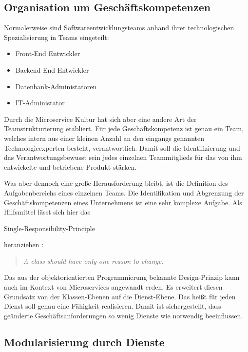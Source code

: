 \subsection{Organisation um Geschäftskompetenzen}

Normalerweise sind Softwareentwicklungsteams anhand ihrer technologischen Spezialisierung in Teams eingeteilt:

\begin{itemize}
	\item Front-End Entwickler
	\item Backend-End Entwickler
	\item Datenbank-Administatoren
	\item IT-Administator
\end{itemize}

Durch die Microservice Kultur hat sich aber eine andere Art der Teamstrukturierung etabliert. Für jede Geschäftskompetenz ist genau ein Team, welches intern aus einer kleinen Anzahl an den eingangs genannten Technologieexperten besteht, verantwortlich. Damit soll die Identifizierung und das Verantwortungsbewusst sein jedes einzelnen Teammitglieds für das von ihm entwickelte und betriebene Produkt stärken.

Was aber dennoch eine große Herausforderung bleibt, ist die Definition des Aufgabenbereichs eines einzelnen Teams. Die Identifikation und Abgrenzung der Geschäftskompetenzen eines Unternehmens ist eine sehr komplexe Aufgabe. Als Hilfsmittel lässt sich hier das \begin{english} Single-Responsibility-Principle\end{english} heranziehen \cite{MartinAgile}: 

\begin{english}
\begin{quote}
  \textit{A class should have only one reason to change.}
\end{quote}
\end{english}

Das aus der objektorientierten Programmierung bekannte Design-Prinzip kann auch im Kontext von Microservices angewandt erden. Es erweitert diesen Grundsatz von der Klassen-Ebenen auf die Dienst-Ebene. Das heißt für jeden Dienst soll genau eine Fähigkeit realisieren. Damit ist sichergestellt, dass geänderte Geschäftsanforderungen so wenig Dienste wie notwendig beeinflussen.

\subsection{Modularisierung durch Dienste}
\label{subsec:Componentization}

